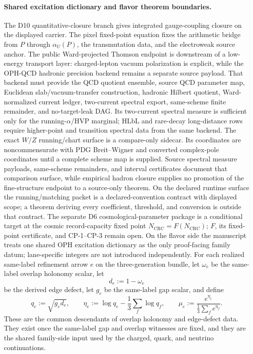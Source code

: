 \documentclass[11pt]{article}
\begin{document}
\paragraph{Shared excitation dictionary and flavor theorem boundaries.}
The D10 quantitative-closure branch gives integrated gauge-coupling closure on the displayed carrier. The pixel fixed-point equation fixes the arithmetic bridge from \(P\) through \(\alpha_U(P)\), the transmutation data, and the electroweak source anchor. The public Ward-projected Thomson endpoint is downstream of a low-energy transport layer: charged-lepton vacuum polarization is explicit, while the OPH-QCD hadronic precision backend remains a separate source payload. That backend must provide the QCD quotient ensemble, source QCD parameter map, Euclidean slab/vacuum-transfer construction, hadronic Hilbert quotient, Ward-normalized current ledger, two-current spectral export, same-scheme finite remainder, and no-target-leak DAG. Its two-current spectral measure is sufficient only for the running-\(\alpha\)/HVP marginal; HLbL and rare-decay long-distance rows require higher-point and transition spectral data from the same backend. The exact \(W/Z\) running/chart surface is a compare-only sidecar. Its coordinates are noncommensurate with PDG Breit--Wigner and converted complex-pole coordinates until a complete scheme map is supplied. Source spectral measure payloads, same-scheme remainders, and interval certificates document that comparison surface, while empirical hadron closure supplies no promotion of the fine-structure endpoint to a source-only theorem. On the declared runtime surface the running/matching packet is a declared-convention contract with displayed scope; a theorem deriving every coefficient, threshold, and conversion is outside that contract. The separate D6 cosmological-parameter package is a conditional target at the cosmic record-capacity fixed point \(N_{\mathrm{CRC}}=F(N_{\mathrm{CRC}})\); \(F\), its fixed-point certificate, and CP-1--CP-3 remain open. On the flavor side the manuscript treats one shared OPH excitation dictionary as the only proof-facing family datum; lane-specific integers are not introduced independently. For each realized same-label refinement arrow \(e\) on the three-generation bundle, let \(\omega_e\) be the same-label overlap holonomy scalar, let
\[
d_e:=1-\omega_e
\]
be the derived edge defect, let \(g_e\) be the same-label gap scalar, and define
\[
q_e:=\sqrt{g_e d_e},
\qquad
\eta_e:=\log q_e-\frac13\sum_f \log q_f,
\qquad
\mu_e:=\frac{e^{\eta_e}}{\frac13\sum_f e^{\eta_f}}.
\]
These are the common descendants of overlap holonomy and edge-defect data. They exist once the same-label gap and overlap witnesses are fixed, and they are the shared family-side input used by the charged, quark, and neutrino continuations.
\end{document}
